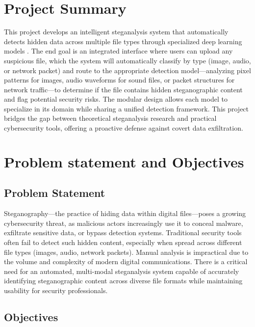 \documentclass[12pt]{article}
\begin{document}
\newpage    %
\tableofcontents

\newpage

\section{Project Summary}
This project develops an intelligent steganalysis system that automatically detects hidden data across multiple file types through specialized deep learning models . The end goal is an integrated interface where users can upload any suspicious file, which the system will automatically classify by type (image, audio, or network packet) and route to the appropriate detection model—analyzing pixel patterns for images, audio waveforms for sound files, or packet structures for network traffic—to determine if the file contains hidden steganographic content and flag potential security risks. The modular design allows each model to specialize in its domain while sharing a unified detection framework.
This project bridges the gap between theoretical steganalysis research and practical cybersecurity tools, offering a proactive defense against covert data exfiltration.
\newpage
\section{Problem statement and Objectives}
\subsection{Problem Statement}
Steganography—the practice of hiding data within digital files—poses a growing cybersecurity threat, as malicious actors increasingly use it to conceal malware, exfiltrate sensitive data, or bypass detection systems. Traditional security tools often fail to detect such hidden content, especially when spread across different file types (images, audio, network packets). Manual analysis is impractical due to the volume and complexity of modern digital communications. There is a critical need for an automated, multi-modal steganalysis system capable of accurately identifying steganographic content across diverse file formats while maintaining usability for security professionals.

\subsection{Objectives}
\end{document}
